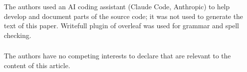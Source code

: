 \documentclass[runningheads]{llncs}
\begin{document}
\begin{credits}
\subsubsection{\ackname}
The authors used an AI coding assistant (Claude Code, Anthropic) to help develop and document parts of the source code; it was not used to generate the text of this paper. Writefull plugin of overleaf was used for grammar and spell checking.

\subsubsection{\discintname}
The authors have no competing interests to declare that are relevant to the content of this article.
\end{credits}



\end{document}
